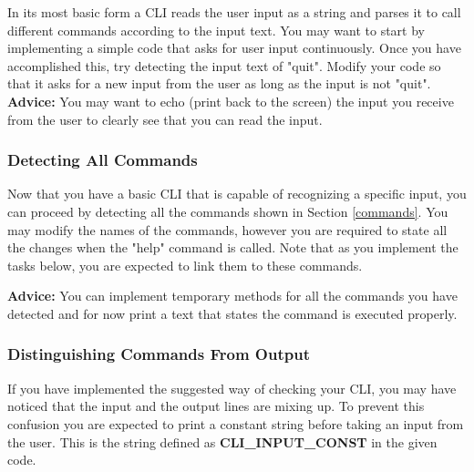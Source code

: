 \documentclass[a4paper]{article}
\begin{document}
	In its most basic form a CLI reads the user input as a string and parses it to call different commands according to the input text. You may want to start by implementing a simple code that asks for user input continuously. Once you have accomplished this, try detecting the input text of "quit". Modify your code so that it asks for a new input from the user as long as the input is not "quit". \\

	\noindent \textbf{Advice:} You may want to echo (print back to the screen) the input you receive from the user to clearly see that you can read the input.
	
	\subsubsection{Detecting All Commands}
	
	Now that you have a basic CLI that is capable of recognizing a specific input, you can proceed by detecting all the commands shown in Section \ref{commands}. You may modify the names of the commands, however you are required to state all the changes when the "help" command is called. Note that as you implement the tasks below, you are expected to link them to these commands.
	
	\noindent \textbf{Advice:} You can implement temporary methods for all the commands you have detected and for now print a text that states the command is executed properly.
	
	\subsubsection{Distinguishing Commands From Output}
	
	If you have implemented the suggested way of checking your CLI, you may have noticed that the input and the output lines are mixing up. To prevent this confusion you are expected to print a constant string before taking an input from the user. This is the string defined as \textbf{CLI\_INPUT\_CONST} in the given code.
	
	
\end{document}
